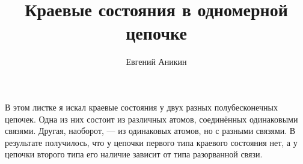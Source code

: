 \documentclass{article}
\title{Краевые состояния в одномерной цепочке}
\author{Евгений Аникин}
\begin{document}
\maketitle
В этом листке я искал краевые состояния у двух разных полубесконечных цепочек. Одна 
из них состоит из различных атомов, соединённых одинаковыми связями. Другая, наоборот, ---
из одинаковых атомов, но с разными связями. В результате получилось, что у цепочки первого
типа краевого состояния нет, а у цепочки второго типа его наличие зависит от типа разорванной
связи.



\end{document}
